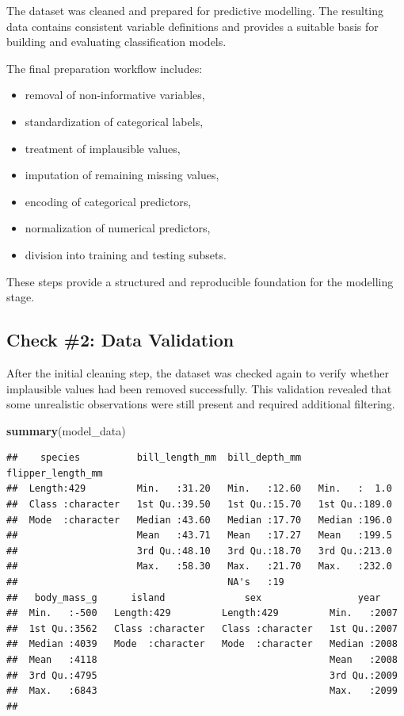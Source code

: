 \documentclass[
]{article}
\newenvironment{Shaded}{\begin{snugshade}}{\end{snugshade}}
\newcommand{\FunctionTok}[1]{\textcolor[rgb]{0.13,0.29,0.53}{\textbf{#1}}}
\newcommand{\NormalTok}[1]{#1}
\providecommand{\tightlist}{%
  \setlength{\itemsep}{0pt}\setlength{\parskip}{0pt}}
\begin{document}
The dataset was cleaned and prepared for predictive modelling. The
resulting data contains consistent variable definitions and provides a
suitable basis for building and evaluating classification models.

The final preparation workflow includes:

\begin{itemize}
\tightlist
\item
  removal of non-informative variables,
\item
  standardization of categorical labels,
\item
  treatment of implausible values,
\item
  imputation of remaining missing values,
\item
  encoding of categorical predictors,
\item
  normalization of numerical predictors,
\item
  division into training and testing subsets.
\end{itemize}

These steps provide a structured and reproducible foundation for the
modelling stage.

\subsection{Check \#2: Data Validation}\label{check-2-data-validation}

After the initial cleaning step, the dataset was checked again to verify
whether implausible values had been removed successfully. This
validation revealed that some unrealistic observations were still
present and required additional filtering.

\begin{Shaded}
\begin{Highlighting}[]
\FunctionTok{summary}\NormalTok{(model\_data)}
\end{Highlighting}
\end{Shaded}

\begin{verbatim}
##    species          bill_length_mm  bill_depth_mm   flipper_length_mm
##  Length:429         Min.   :31.20   Min.   :12.60   Min.   :  1.0    
##  Class :character   1st Qu.:39.50   1st Qu.:15.70   1st Qu.:189.0    
##  Mode  :character   Median :43.60   Median :17.70   Median :196.0    
##                     Mean   :43.71   Mean   :17.27   Mean   :199.5    
##                     3rd Qu.:48.10   3rd Qu.:18.70   3rd Qu.:213.0    
##                     Max.   :58.30   Max.   :21.70   Max.   :232.0    
##                                     NA's   :19                       
##   body_mass_g      island              sex                 year     
##  Min.   :-500   Length:429         Length:429         Min.   :2007  
##  1st Qu.:3562   Class :character   Class :character   1st Qu.:2007  
##  Median :4039   Mode  :character   Mode  :character   Median :2008  
##  Mean   :4118                                         Mean   :2008  
##  3rd Qu.:4795                                         3rd Qu.:2009  
##  Max.   :6843                                         Max.   :2099  
## 
\end{verbatim}
\end{document}
